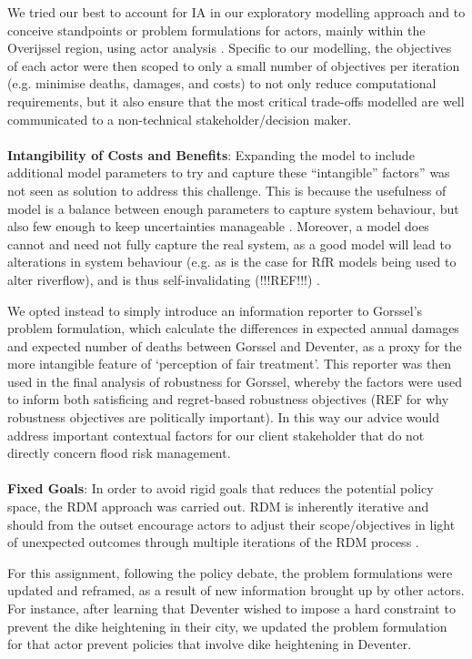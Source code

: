 We tried our best to account for IA in our exploratory modelling approach and to conceive standpoints or problem formulations for actors, mainly within the Overijssel region, using actor analysis \parencite{enserink_policy_2010}. Specific to our modelling, the objectives of each actor were then scoped to only a small number of objectives per iteration (e.g. minimise deaths, damages, and costs) to not only reduce computational requirements, but it also ensure that the most critical trade-offs modelled are well communicated to a non-technical stakeholder/decision maker. 
\\ \\
\textbf{Intangibility of Costs and Benefits}: Expanding the model to include additional model parameters to try and capture these “intangible” factors” was not seen as solution to address this challenge. This is because the usefulness of model is a balance between enough parameters to capture system behaviour, but also few enough to keep uncertainties manageable \parencite{saltelli_five_2020}. Moreover, a model does cannot and need not fully capture the real system, as a good model will lead to alterations in system behaviour (e.g. as is the case for RfR models being used to alter riverflow), and is thus self-invalidating (!!!REF!!!) \parencite{}.

We opted instead to simply introduce an information reporter to Gorssel’s problem formulation, which calculate the differences in expected annual damages and expected number of deaths between Gorssel and Deventer, as a proxy for the more intangible feature of ‘perception of fair treatment’. This reporter was then used in the final analysis of robustness for Gorssel, whereby the factors were used to inform both satisficing and regret-based robustness objectives (REF for why robustness objectives are politically important). In this way our advice would address important contextual factors for our client stakeholder that do not directly concern flood risk management. 
\\ \\
\textbf{Fixed Goals}: In order to avoid rigid goals that reduces the potential policy space, the RDM approach was carried out. RDM is inherently iterative and should from the outset encourage actors to adjust their scope/objectives in light of unexpected outcomes through multiple iterations of the RDM process \parencite{lempert_general_2006}. 

For this assignment, following the policy debate, the problem formulations were updated and reframed, as a result of new information brought up by other actors. For instance, after learning that Deventer wished to impose a hard constraint to prevent the dike heightening in their city, we updated the problem formulation for that actor prevent policies that involve dike heightening in Deventer. 

